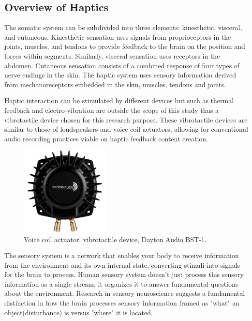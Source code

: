         \subsection{Overview of Haptics}
            The somatic system can be subdivided into three elements: kinesthetic, visceral, and cutaneous. Kinesthetic sensation uses signals from proprioceptors in the joints, muscles, and tendons to provide feedback to the brain on the position and forces within segments. Similarly, visceral sensation uses receptors in the abdomen. Cutaneous sensation consists of a combined response of four types of nerve endings in the skin\cite{Blank}. The haptic system uses sensory information derived from mechanoreceptors embedded in the skin, muscles, tendons and joints\cite{Blank}.\par

            Haptic interaction can be stimulated by different devices but such as thermal feedback and electro-vibration are outside the scope of this study thus a vibrotactile device chosen for this research purpose. These vibrotactile devices are similar to those of loudspeakers and voice coil actuators\cite{Blank}, allowing for conventional audio recording practices viable on haptic feedback content creation.\par

            \begin{figure}[H]
                \centering
                \includegraphics[width=0.4\textwidth]{images/vibrotactile_bass-shaker.jpg}
                \caption{Voice coil actuator, vibrotactile device, Dayton Audio BST-1.}
                \label{fig:VCA}
            \end{figure}

            The sensory system is a network that enables your body to receive information from the environment and its own internal state, converting stimuli into signals for the brain to process. Human sensory system doesn't just process this sensory information as a single stream; it organizes it to answer fundamental questions about the environment\cite{Blank}. Research in sensory neuroscience suggests a fundamental distinction in how the brain processes sensory information framed as "what" an object(disturbance) is versus "where" it is located.\par

